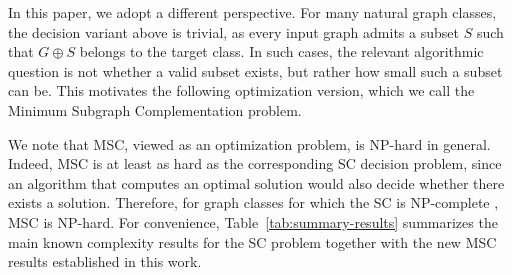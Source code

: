 \documentclass[11pt]{article}
\theoremstyle{definition}
\begin{document}

In this paper, we adopt a different perspective.  
For many natural graph classes, the decision variant above is trivial, as every input graph admits a subset $S$ such that $G \oplus S$ belongs to the target class.  
In such cases, the relevant algorithmic question is not whether a valid subset exists, but rather how small such a subset can be.  
This motivates the following optimization version, which we call the Minimum Subgraph Complementation problem.

\medskip
{}
\medskip

We note that MSC, viewed as an optimization problem, is NP-hard in general.
Indeed, MSC is at least as hard as the corresponding SC
decision problem, since an algorithm that computes an optimal solution would
also decide whether there exists a solution.
Therefore, for graph classes for which the SC is NP-complete
\cite{DBLP:journals/algorithmica/FominGST20,
DBLP:journals/algorithmica/AntonyGPSSS22,
antony2024cutting},
MSC is NP-hard.
For convenience, Table~\ref{tab:summary-results} summarizes the main known complexity results for the SC problem together with the new MSC results established in this work.
\end{document}
